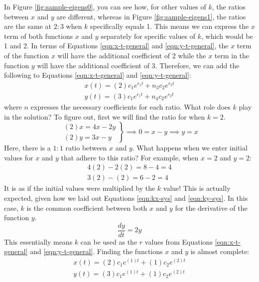 \documentclass[12pt]{article}
\begin{document}
	In Figure \ref{fig:sample-eigens0}, you can see how, for other values of $k$, the ratios between $x$ and $y$ are different, whereas in Figure \ref{fig:sample-eigens1}, the ratios are the same at $2 : 3$ when $k$ specifically equals 1.
	This means we can express the $x$ term of both functions $x$ and $y$ separately for specific values of $k$, which would be 1 and 2.
	In terms of Equations \eqref{eqn:x-t-general} and \eqref{eqn:y-t-general}, the $x$ term of the function $x$ will have the additional coefficient of 2 while the $x$ term in the function $y$ will have the additional coefficient of 3.
	Therefore, we can add the following to Equations \eqref{eqn:x-t-general} and \eqref{eqn:y-t-general}:
	\begin{align}
		x(t) = (2)c_1e^{r_1t} + n_3c_2e^{r_2t} \label{eqn:x-t-partial} \\
		y(t) = (3)c_1e^{r_1t} + n_4c_2e^{r_2t} \label{eqn:y-t-partial}
	\end{align}
	where $n$ expresses the necessary coefficients for each ratio. What role does $k$ play in the solution? To figure out, first we will find the ratio for when $k = 2$.
	\begin{equation*}
		\left. \begin{array}{l}
			(2)x = 4x - 2y \\
			(2)y = 3x - y
		\end{array} \right \}
		\implies 0 = x - y \implies y = x
	\end{equation*}
	Here, there is a $1 : 1$ ratio between $x$ and $y$. What happens when we enter initial values for $x$ and $y$ that adhere to this ratio? For example, when $x = 2$ and $y = 2$:
	\begin{gather*}
		4(2) - 2(2) = 8 - 4 = 4 \\
		3(2) - (2) = 6 - 2 = 4 
	\end{gather*} %
	It is as if the initial values were multiplied by the $k$ value!
	This is actually expected, given how we laid out Equations \eqref{eqn:kx-sys} and \eqref{eqn:ky-sys}.
	In this case, $k$ is the common coefficient between both $x$ and $y$ for the derivative of the function $y$.
	\begin{equation*}
		\frac{dy}{dt} = 2y %
	\end{equation*}
	This essentially means $k$ can be used as the $r$ values from Equations \eqref{eqn:x-t-general} and \eqref{eqn:y-t-general}.
	Finding the functions $x$ and $y$ is almost complete:
	\begin{align*}
		x(t) = (2)c_1e^{(1)t} + (1)c_2e^{(2)t} \\
		y(t) = (3)c_1e^{(1)t} + (1)c_2e^{(2)t}
	\end{align*}
\end{document}
